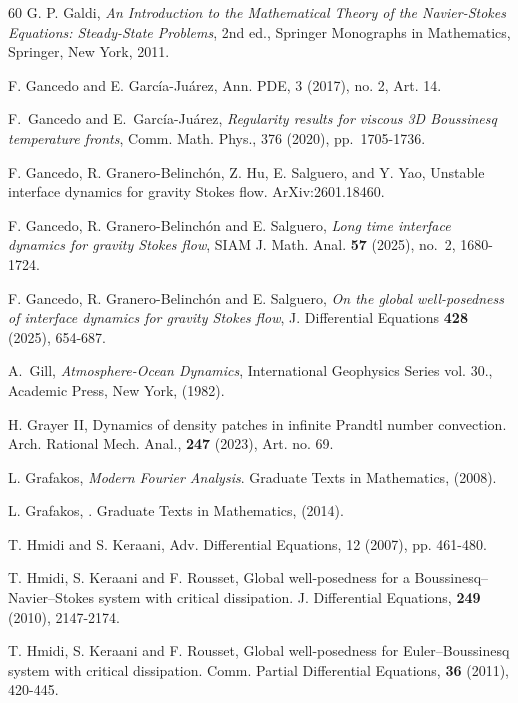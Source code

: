 \documentclass[reqno,11pt,a4paper]{amsart}
\begin{document}
\begin{thebibliography}{60}
G. P. Galdi,
\emph{An Introduction to the Mathematical Theory of
the Navier-Stokes Equations: Steady-State Problems},
2nd ed., Springer Monographs in Mathematics,
Springer, New York, 2011.

F. Gancedo and E. Garc\'ia-Ju\'arez,
Ann. PDE, 3 (2017), no. 2, Art. 14.



F.~Gancedo and E.~Garc\'ia-Ju\'arez,
{\it Regularity results for viscous 3D Boussinesq temperature fronts},
Comm. Math. Phys., 376 (2020), pp.~1705-1736.

F. Gancedo, R. Granero-Belinch\'on, Z. Hu, E. Salguero, and Y. Yao,
Unstable interface dynamics for gravity Stokes flow.  ArXiv:2601.18460.

F. Gancedo, R. Granero-Belinch\'on and E. Salguero,
{\it Long time interface dynamics for gravity Stokes flow},
SIAM J. Math. Anal. {\bf 57} (2025), no.~2, 1680-1724.

F. Gancedo, R. Granero-Belinch\'on and E. Salguero,
{\it On the global well-posedness of interface dynamics for gravity
Stokes flow},
J. Differential Equations {\bf 428} (2025), 654-687.

 A.~Gill,
{\em Atmosphere-Ocean Dynamics}, International Geophysics Series vol. 30., Academic Press, New York, (1982).

H. Grayer II,
Dynamics of density patches in infinite Prandtl number convection.
Arch. Rational Mech. Anal., \textbf{247} (2023), Art. no. 69.

L. Grafakos,
{\it Modern Fourier Analysis}.
Graduate Texts in Mathematics, (2008).

L. Grafakos,
.
Graduate Texts in Mathematics, (2014).

T. Hmidi and S. Keraani,
Adv. Differential Equations, 12 (2007), pp. 461-480.

T. Hmidi, S. Keraani and F. Rousset,
Global well-posedness for a Boussinesq–Navier–Stokes system with critical dissipation.
J. Differential
Equations, \textbf{249} (2010), 2147-2174.

T. Hmidi, S. Keraani and F. Rousset,
Global well-posedness for Euler–Boussinesq system with critical dissipation.
Comm. Partial Differential Equations, \textbf{36} (2011), 420-445.


\end{thebibliography}
\end{document}
